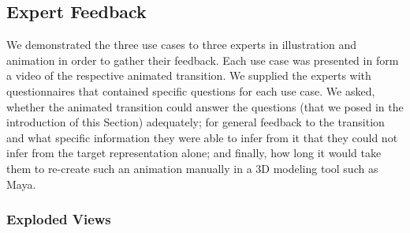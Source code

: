 
\subsection{Expert Feedback}

We demonstrated the three use cases to three experts in illustration and animation in order to gather their feedback.
Each use case was presented in form a video of the respective animated transition.
We supplied the experts with questionnaires that contained specific questions for each use case.
We asked, whether the animated transition could answer the questions (that we posed in the introduction of this Section) adequately; for general feedback to the transition and what specific information they were able to infer from it that they could not infer from the target representation alone; and finally, how long it would take them to re-create such an animation manually in a 3D modeling tool such as Maya.



\subsubsection{Exploded Views}





